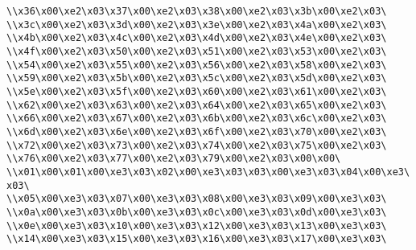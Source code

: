 \verb|\\x36\x00\xe2\x03\x37\x00\xe2\x03\x38\x00\xe2\x03\x3b\x00\xe2\x03\|\newline
\verb|\\x3c\x00\xe2\x03\x3d\x00\xe2\x03\x3e\x00\xe2\x03\x4a\x00\xe2\x03\|\newline
\verb|\\x4b\x00\xe2\x03\x4c\x00\xe2\x03\x4d\x00\xe2\x03\x4e\x00\xe2\x03\|\newline
\verb|\\x4f\x00\xe2\x03\x50\x00\xe2\x03\x51\x00\xe2\x03\x53\x00\xe2\x03\|\newline
\verb|\\x54\x00\xe2\x03\x55\x00\xe2\x03\x56\x00\xe2\x03\x58\x00\xe2\x03\|\newline
\verb|\\x59\x00\xe2\x03\x5b\x00\xe2\x03\x5c\x00\xe2\x03\x5d\x00\xe2\x03\|\newline
\verb|\\x5e\x00\xe2\x03\x5f\x00\xe2\x03\x60\x00\xe2\x03\x61\x00\xe2\x03\|\newline
\verb|\\x62\x00\xe2\x03\x63\x00\xe2\x03\x64\x00\xe2\x03\x65\x00\xe2\x03\|\newline
\verb|\\x66\x00\xe2\x03\x67\x00\xe2\x03\x6b\x00\xe2\x03\x6c\x00\xe2\x03\|\newline
\verb|\\x6d\x00\xe2\x03\x6e\x00\xe2\x03\x6f\x00\xe2\x03\x70\x00\xe2\x03\|\newline
\verb|\\x72\x00\xe2\x03\x73\x00\xe2\x03\x74\x00\xe2\x03\x75\x00\xe2\x03\|\newline
\verb|\\x76\x00\xe2\x03\x77\x00\xe2\x03\x79\x00\xe2\x03\x00\x00\|\newline
\verb|\\x01\x00\x01\x00\xe3\x03\x02\x00\xe3\x03\x03\x00\xe3\x03\x04\x00\xe3\x03\|\newline
\verb|\\x05\x00\xe3\x03\x07\x00\xe3\x03\x08\x00\xe3\x03\x09\x00\xe3\x03\|\newline
\verb|\\x0a\x00\xe3\x03\x0b\x00\xe3\x03\x0c\x00\xe3\x03\x0d\x00\xe3\x03\|\newline
\verb|\\x0e\x00\xe3\x03\x10\x00\xe3\x03\x12\x00\xe3\x03\x13\x00\xe3\x03\|\newline
\verb|\\x14\x00\xe3\x03\x15\x00\xe3\x03\x16\x00\xe3\x03\x17\x00\xe3\x03\|\newline
